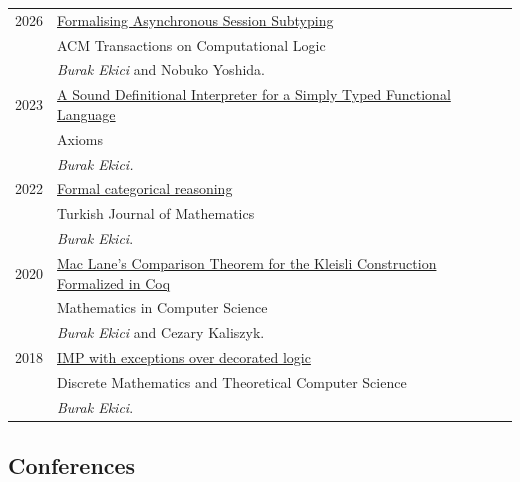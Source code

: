 \documentclass[a4paper,9pt]{article} %
\begin{document}
\begin{tabular}{ll}	
2026 & {\href{https://dl.acm.org/doi/10.1145/3815176}{Formalising Asynchronous Session Subtyping}}\\
& ACM Transactions on Computational Logic\\
&  \emph{Burak Ekici} and Nobuko Yoshida.
 \\[0.20cm]
2023 & {\href{https://www.mdpi.com/2075-1680/12/1/43/pdf}{A Sound Definitional Interpreter for a Simply Typed Functional Language}}\\
& Axioms\\
&  \emph{Burak Ekici.}
 \\[0.20cm]
2022 &
{\href{https://journals.tubitak.gov.tr/cgi/viewcontent.cgi?article=3178&context=math}{Formal categorical reasoning}}\\
& Turkish Journal of Mathematics\\
& \emph{Burak Ekici}.
 \\[0.20cm]
2020 &
{\href{https://link.springer.com/content/pdf/10.1007%2Fs11786-020-00450-8.pdf}{Mac Lane’s Comparison Theorem for the Kleisli
Construction Formalized in Coq}}\\
& Mathematics in Computer Science\\
& \emph{Burak Ekici} and Cezary Kaliszyk.
 \\[0.20cm]
2018 & 
\href{https://dmtcs.episciences.org/4927}{IMP with exceptions over decorated logic}\\
& Discrete Mathematics and Theoretical Computer Science\\
& \emph{Burak Ekici}.
\end{tabular}



\subsection*{Conferences}
\end{document}
